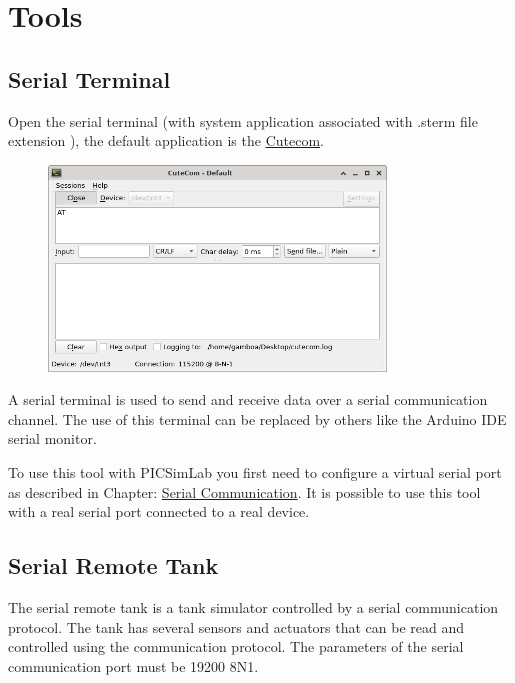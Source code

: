 \chapter{Tools}


\section{Serial Terminal} \hypertarget{def:sterm}{}

Open the serial terminal (with system application associated with .sterm file extension ), the default application is the 
\href{https://github.com/neundorf/CuteCom}{Cutecom}. 

\begin{figure}[H]
\center
\includegraphics[width=0.8\textwidth]{img/cutecom.png} 
\end{figure} 

A serial terminal is used to send and receive data over a serial communication channel. 
The use of this terminal can be replaced by others like the Arduino IDE serial monitor. 

To use this tool with PICSimLab you first need to configure a virtual serial port as described in Chapter: \hyperlink{def:seriali}{Serial Communication}.
It is possible to use this tool with a real serial port connected to a real device. 


\section {Serial Remote Tank} \hypertarget{def:srtank}{}


The serial remote tank is a tank simulator controlled by a serial communication protocol.
The tank has several sensors and actuators that can be read and controlled using the communication protocol. 
The parameters of the serial communication port must be  19200 8N1. 


